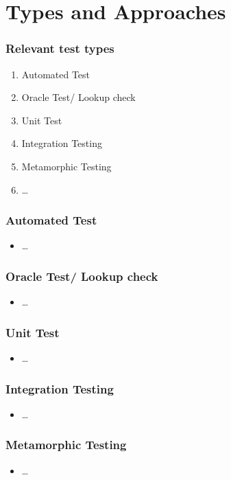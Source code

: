\section{Types and Approaches}

\begin{frame}[fragile]
\frametitle{Relevant test types}
\begin{enumerate}
\item Automated Test
\item Oracle Test/ Lookup check
\item Unit Test
\item Integration Testing
\item Metamorphic Testing
\item \ldots
\end{enumerate}
\end{frame}

\begin{frame}[fragile]
\frametitle{Automated Test}
\begin{itemize}
\item \ldots
\end{itemize}
\end{frame}

\begin{frame}[fragile]
\frametitle{Oracle Test/ Lookup check}
\begin{itemize}
\item \ldots
\end{itemize}
\end{frame}

\begin{frame}[fragile]
\frametitle{Unit Test}
\begin{itemize}
\item \ldots
\end{itemize}
\end{frame}

\begin{frame}[fragile]
\frametitle{Integration Testing}
\begin{itemize}
\item \ldots
\end{itemize}
\end{frame}

\begin{frame}[fragile]
\frametitle{Metamorphic Testing}
\begin{itemize}
\item \ldots
\end{itemize}
\end{frame}

